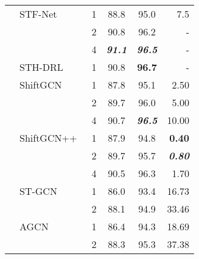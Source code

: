 \documentclass[journal]{IEEEtran}
\newcommand\paretocolor{lgreen!20}
\theoremstyle{definition}
\begin{document}
\begin{table}[!btp]
\begin{center}
{\begin{tabular}{llcccr}
    & {STF-Net}~\cite{wu2023spatiotemporal}      & {1}             & {88.8}  & {95.0}    & {7.5} \\
    &                                               & {2}             & {90.8}  & {96.2}    & {-} \\
    &                                               & {4}             & \textbf{\textit{{91.1}}}  & \textbf{\textit{{96.5}}}    & - \\

    & {STH-DRL}~\cite{nikpour2023spatio}         & {1}        & {90.8}  & \textbf{{96.7}}    & {-} \\
    

    

    
    & ShiftGCN~\cite{cheng2020skeleton}             & 1             & 87.8  & 95.1    & 2.50 \\ 
    &                                               & 2             & 89.7  & 96.0    & 5.00 \\ 
    &                                               & 4             & \colorbox{\paretocolor}{90.7}  & \colorbox{\paretocolor}{\textbf{\textit{96.5}}}    & \colorbox{\paretocolor}{10.00} \\ 
    & ShiftGCN++~\cite{cheng2021extremely}          & 1             & \colorbox{\paretocolor}{87.9}  & \colorbox{\paretocolor}{94.8}    & \colorbox{\paretocolor}{\textbf{0.40}} \\ 
    &                                               & 2             & \colorbox{\paretocolor}{89.7}  &  \colorbox{\paretocolor}{95.7}    & \colorbox{\paretocolor}{\textbf{\textit{0.80}}} \\ 
    &                                               & 4             &  \colorbox{\paretocolor}{90.5}  & \colorbox{\paretocolor}{96.3}    & \colorbox{\paretocolor}{1.70} \\ 
    \addlinespace[0.5ex] \cline{2-6} \addlinespace[0.5ex]
    
    & ST-GCN                              & 1             & 86.0  & 93.4    & 16.73 \\
    &                                               & 2             & 88.1  & 94.9    & 33.46 \\
  
    & AGCN                                & 1             & 86.4  & 94.3    & 18.69 \\
    &                                               & 2             & 88.3  & 95.3    & 37.38 \\
  

\end{tabular}}
\end{center}
\end{table}
\end{document}
